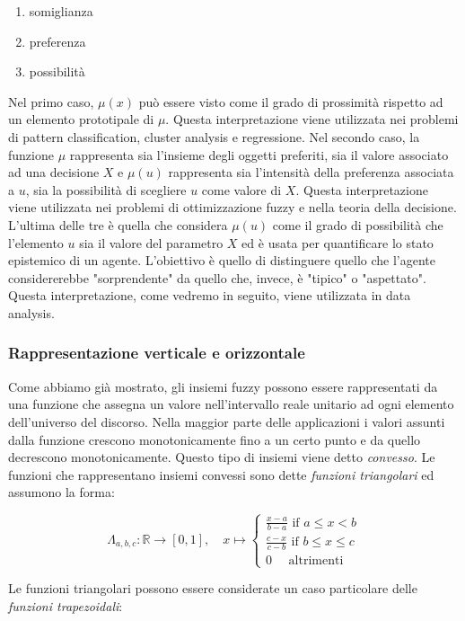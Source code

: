 \documentclass[10pt,a4paper]{article}
\begin{document}
\begin{enumerate}
\item{somiglianza}
\item{preferenza}
\item{possibilità}
\end{enumerate}

Nel primo caso, $\mu(x)$ può essere visto come il grado di prossimità rispetto ad un elemento prototipale di $\mu$. Questa interpretazione viene utilizzata nei problemi di pattern classification, cluster analysis e regressione. Nel secondo caso, la funzione $\mu$ rappresenta sia l'insieme degli oggetti preferiti, sia il valore associato ad una decisione $X$ e $\mu(u)$ rappresenta sia l'intensità della preferenza associata a $u$, sia la possibilità di scegliere $u$ come valore di $X$. Questa interpretazione viene utilizzata nei problemi di ottimizzazione fuzzy e nella teoria della decisione. L'ultima delle tre è quella che considera $\mu(u)$ come il grado di possibilità che l'elemento $u$ sia il valore del parametro $X$ ed è usata per quantificare lo stato epistemico di un agente. L'obiettivo è quello di distinguere quello che l'agente considererebbe "sorprendente" da quello che, invece, è "tipico" o "aspettato". Questa interpretazione, come vedremo in seguito, viene utilizzata in data analysis.

\subsubsection{Rappresentazione verticale e orizzontale}

Come abbiamo già mostrato, gli insiemi fuzzy possono essere rappresentati da una funzione che assegna un valore nell'intervallo reale unitario ad ogni elemento dell'universo del discorso. Nella maggior parte delle applicazioni i valori assunti dalla funzione crescono monotonicamente fino a un certo punto e da quello decrescono monotonicamente. Questo tipo di insiemi viene detto \emph{convesso}. Le funzioni che rappresentano insiemi convessi sono dette \emph{funzioni triangolari} ed assumono la forma:

$$
\Lambda_{a,b,c} : \mathbb{R} \to [0,1],\quad x \mapsto 
\begin{cases}
\frac{x-a}{b-a} \text{ if } a \leq x < b \\
\frac{c-x}{c-b} \text{ if } b \leq x \leq c \\
0 \quad \text{  altrimenti}
\end{cases}
$$

Le funzioni triangolari possono essere considerate un caso particolare delle \emph{funzioni trapezoidali}:
\end{document}
